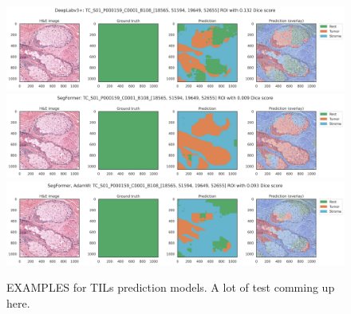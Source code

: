 \begin{figure}
\includegraphics[width=\linewidth]{figures/tissue/deeplabv3+_dice_tc_TC_S01_P000159_C0001_B108_[18565, 51594, 19649, 52655]_check.png}
\includegraphics[width=\linewidth]{figures/tissue/segformer_dice_tc_TC_S01_P000159_C0001_B108_[18565, 51594, 19649, 52655]_check.png}
\includegraphics[width=\linewidth]{figures/tissue/segformer,_adamw_dice_tc_TC_S01_P000159_C0001_B108_[18565, 51594, 19649, 52655]_check.png}

\caption{EXAMPLES for TILs prediction models. A lot of test comming up here.}
\label{fig:figure3}
\end{figure}

